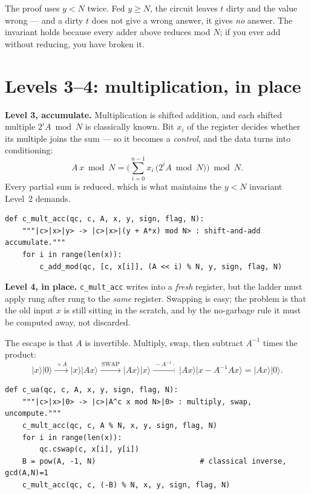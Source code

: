 \documentclass[11pt]{article}
\renewcommand{\ket}[1]{\lvert #1 \rangle}
\newcommand{\code}[1]{\texttt{#1}}
\theoremstyle{plain}
\theoremstyle{remark}
\begin{document}
\begin{warnbox}[title={The precondition is load-bearing}]
The proof uses $y<N$ twice. Fed $y\ge N$, the circuit leaves $t$ dirty and the value wrong --- and
a dirty $t$ does not give a wrong answer, it gives \emph{no} answer. The invariant holds because
every adder above reduces mod $N$; if you ever add without reducing, you have broken it.
\end{warnbox}

\section{Levels 3--4: multiplication, in place}\label{im:sec:l34}

\textbf{Level 3, accumulate.} Multiplication is shifted addition, and each shifted multiple
$2^iA\bmod N$ is classically known. Bit $x_i$ of the register decides whether its multiple joins
the sum --- so it becomes a \emph{control}, and the data turns into conditioning:
\[
A\,x \bmod N=\Big(\sum_{i=0}^{n-1}x_i\,\big(2^iA\bmod N\big)\Big)\bmod N .
\]
Every partial sum is reduced, which is what maintains the $y<N$ invariant Level~2 demands.

\begin{lstlisting}
def c_mult_acc(qc, c, A, x, y, sign, flag, N):
    """|c>|x>|y> -> |c>|x>|(y + A*x) mod N> : shift-and-add accumulate."""
    for i in range(len(x)):
        c_add_mod(qc, [c, x[i]], (A << i) % N, y, sign, flag, N)
\end{lstlisting}

\textbf{Level 4, in place.} \code{c\_mult\_acc} writes into a \emph{fresh} register, but the ladder
must apply rung after rung to the \emph{same} register. Swapping is easy; the problem is that the
old input $x$ is still sitting in the scratch, and by the no-garbage rule it must be computed away,
not discarded.

The escape is that $A$ is invertible. Multiply, swap, then subtract $A^{-1}$ times the product:
\[
\ket x\ket0
\xrightarrow{\ \times A\ }\ket x\ket{Ax}
\xrightarrow{\ \mathrm{SWAP}\ }\ket{Ax}\ket x
\xrightarrow{\ -A^{-1}\cdot\ }\ket{Ax}\ket{x-A^{-1}Ax}=\ket{Ax}\ket0 .
\]

\begin{lstlisting}
def c_ua(qc, c, A, x, y, sign, flag, N):
    """|c>|x>|0> -> |c>|A^c x mod N>|0> : multiply, swap, uncompute."""
    c_mult_acc(qc, c, A % N, x, y, sign, flag, N)
    for i in range(len(x)):
        qc.cswap(c, x[i], y[i])
    B = pow(A, -1, N)                        # classical inverse, gcd(A,N)=1
    c_mult_acc(qc, c, (-B) % N, x, y, sign, flag, N)
\end{lstlisting}
\end{document}
